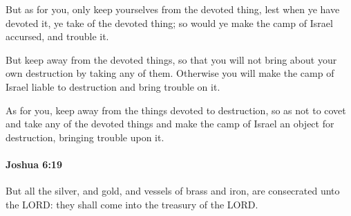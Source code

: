 			\begin{versebox}
					\item[BHS] 
					\item[ASV] But as for you, only keep yourselves from the devoted thing, lest when ye have devoted it, ye take of the devoted thing; so would ye make the camp of Israel accursed, and trouble it.
					\item[NIV] But keep away from the devoted things, so that you will not bring about your own destruction by taking any of them. Otherwise you will make the camp of Israel liable to destruction and bring trouble on it.
					\item[NRSV] As for you, keep away from the things devoted to destruction, so as not to covet and take any of the devoted things and make the camp of Israel an object for destruction, bringing trouble upon it.
			\end{versebox}

		\paragraph{Joshua 6:19} %
			\label{JOSHUA-6-19}

			But all the silver, and gold, and vessels of brass and iron, are consecrated unto the LORD: they shall come into the treasury of the LORD.

